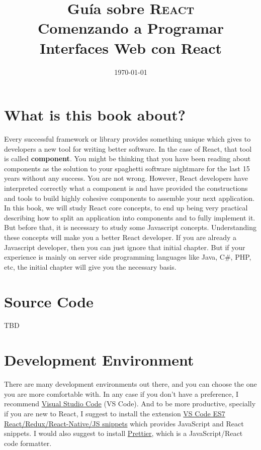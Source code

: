 \documentclass[a4paper, oneside, titlepage, 12pt]{book}
\title{%
	Guía sobre \textsc{React}\\
	\large Comenzando a Programar Interfaces Web con React}
\date{\today}
\begin{document}
\maketitle
\tableofcontents

\chapter*{What is this book about?}

Every successful framework or library provides something unique which gives to developers a new tool for writing better software. In the case of React, that tool is called \textbf{component}. You might be thinking that you have been reading about components as the solution to your spaghetti software nightmare for the last 15 years without any success. You are not wrong. However, React developers have interpreted correctly what a component is and have provided the constructions and tools to build highly cohesive components to assemble your next application. In this book, we will study React core concepts, to end up being very practical describing how to split an application into components and to fully implement it. But before that, it is necessary to study some Javascript concepts. Understanding these concepts will make you a better React developer. If you are already a Javascript developer, then you can just ignore that initial chapter. But if your experience is mainly on server side programming languages like Java, C\#, PHP, etc, the initial chapter will give you the necessary basis.

\chapter*{Source Code}		
TBD%
		
\chapter*{Development Environment}

There are many development environments out there, and you can choose the one you are more comfortable with. In any case if you don't have a preference, I recommend \href{https://code.visualstudio.com/}{Visual Studio Code} (VS Code). And to be more productive, specially if you are new to React, I suggest to install the extension \href{https://marketplace.visualstudio.com/items?itemName=dsznajder.es7-react-js-snippets}{VS Code ES7 React/Redux/React-Native/JS snippets} which provides JavaScript and React snippets. I would also suggest to install \href{https://marketplace.visualstudio.com/items?itemName=esbenp.prettier-vscode}{Prettier}, which is a JavaScript/React code formatter. 
\end{document}
